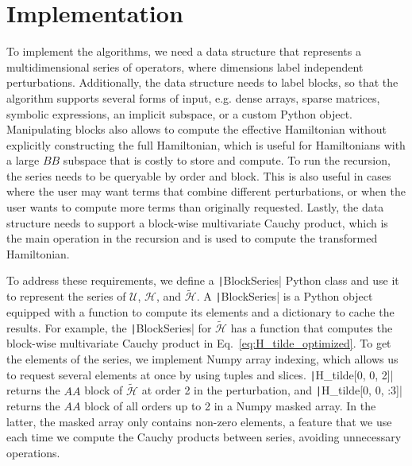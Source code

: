 \section{Implementation}

To implement the algorithms, we need a data structure that represents a
multidimensional series of operators, where dimensions label independent
perturbations.
Additionally, the data structure needs to label blocks, so that the algorithm
supports several forms of input, e.g. dense arrays, sparse matrices, symbolic
expressions, an implicit subspace, or a custom Python object.
Manipulating blocks also allows to compute the effective Hamiltonian without
explicitly constructing the full Hamiltonian, which is useful for Hamiltonians
with a large $BB$ subspace that is costly to store and compute.
To run the recursion, the series needs to be queryable by order and block.
This is also useful in cases where the user may want terms that combine
different perturbations, or when the user wants to compute more terms than
originally requested.
Lastly, the data structure needs to support a block-wise multivariate Cauchy
product, which is the main operation in the recursion and is used to compute
the transformed Hamiltonian.

To address these requirements, we define a \texttt|BlockSeries|
Python class and use it to represent the series of $\mathcal{U}$,
$\mathcal{H}$, and $\tilde{\mathcal{H}}$.
A \texttt|BlockSeries| is a Python object equipped with a function
to compute its elements and a dictionary to cache the results.
For example, the \texttt|BlockSeries| for $\tilde{\mathcal{H}}$ has
a function that computes the block-wise multivariate Cauchy product in
Eq.~\eqref{eq:H_tilde_optimized}.
To get the elements of the series, we implement Numpy array indexing,
which allows us to request several elements at once by using tuples and slices.
\texttt|H_tilde[0, 0, 2]| returns the $AA$ block of
$\tilde{\mathcal{H}}$ at order 2 in the perturbation, and
\texttt|H_tilde[0, 0, :3]| returns the $AA$ block of all orders up
to 2 in a Numpy masked array.
In the latter, the masked array only contains non-zero elements, a feature that
we use each time we compute the Cauchy products between series, avoiding
unnecessary operations.

